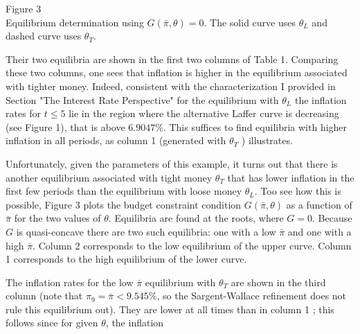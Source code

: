 \documentclass[10pt]{article}
\begin{document}
Figure 3\\
Equilibrium determination using $G(\bar{\pi}, \theta)=0$. The solid curve uses $\theta_{L}$ and dashed curve uses $\theta_{T}$.

Their two equilibria are shown in the first two columns of Table 1. Comparing these two columns, one sees that inflation is higher in the equilibrium associated with tighter money. Indeed, consistent with the characterization I provided in Section "The Interest Rate Perspective" for the equilibrium with $\theta_{L}$ the inflation rates for $t \leq 5$ lie in the region where the alternative Laffer curve is decreasing (see Figure 1), that is above $6.9047 \%$. This suffices to find equilibria with higher inflation in all periods, as column 1 (generated with $\theta_{T}$ ) illustrates.

Unfortunately, given the parameters of this example, it turns out that there is another equilibrium associated with tight money $\theta_{T}$ that has lower inflation in the first few periods than the equilibrium with loose money $\theta_{L}$. Too see how this is possible, Figure 3 plots the budget constraint condition $G(\bar{\pi}, \theta)$ as a function of $\bar{\pi}$ for the two values of $\theta$. Equilibria are found at the roots, where $G=0$. Because $G$ is quasi-concave there are two such equilibria: one with a low $\bar{\pi}$ and one with a high $\bar{\pi}$. Column 2 corresponds to the low equilibrium of the upper curve. Column 1 corresponds to the high equilibrium of the lower curve.

The inflation rates for the low $\bar{\pi}$ equilibrium with $\theta_{T}$ are shown in the third column (note that $\pi_{9}=\bar{\pi}<9.545 \%$, so the Sargent-Wallace refinement does not rule this equilibrium out). They are lower at all times than in column 1 ; this follows since for given $\theta$, the inflation
\end{document}
